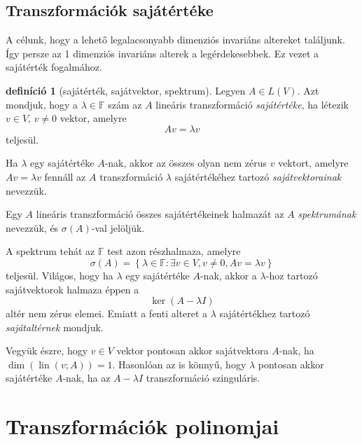 \documentclass[9pt, a4paper, showtrims]{memoir}
\theoremstyle{plain}
\theoremstyle{remark}
\theoremstyle{definition}
\newtheorem{definition}[proposition]{definíció}
\DeclareMathOperator{\lin}{lin}
\begin{document}
\section{Transzformációk sajátértéke}
A célunk, hogy a lehető legalacsonyabb dimenziós invariáns altereket találjunk.
Így persze az 1 dimenziós invariáns alterek a legérdekesebbek.
Ez vezet a sajátérték fogalmához.
\begin{definition}[sajátérték, sajátvektor, spektrum]
	Legyen $A\in L\left( V \right)$.
	Azt mondjuk, hogy a $\lambda\in\mathbb{F}$ szám az $A$ lineáris transzformáció
	\emph{sajátértéke},
	ha létezik $v\in V$, $v\neq 0$ vektor, amelyre
	\[
		Av=\lambda v
	\]
	teljesül.

	Ha $\lambda$ egy sajátértéke $A$-nak,
	akkor az összes olyan nem zérus $v$ vektort,
	amelyre $Av=\lambda v$ fennáll az $A$ transzformáció $\lambda$ sajátértékéhez tartozó
	\emph{sajátvektorainak} nevezzük.

	Egy $A$ lineáris transzformáció összes sajátértékeinek halmazát az
	$A$ \emph{spektrumának} nevezzük, és
	$\sigma\left( A \right)$-val jelöljük.
\end{definition}
A spektrum tehát az $\mathbb{F}$ test azon részhalmaza, amelyre
\[
	\sigma\left( A \right)
	=
	\left\{
	\lambda\in\mathbb{F}:\exists v\in V, v\neq 0, Av=\lambda v
	\right\}
\]
teljesül.
Világos, hogy ha $\lambda$ egy sajátértéke $A$-nak, akkor a $\lambda$-hoz tartozó
sajátvektorok halmaza éppen a
\[
	\ker\left( A-\lambda I \right)
\]
altér nem zérus elemei.
Emiatt a fenti alteret a $\lambda$ sajátértékhez tartozó \emph{sajátaltérnek}
mondjuk.

Vegyük észre,
hogy $v\in V$ vektor pontosan akkor sajátvektora $A$-nak, ha $\dim\left( \lin\left( v;A \right) \right)=1$.
Hasonlóan az is könnyű, hogy $\lambda$ pontosan akkor sajátértéke $A$-nak,
ha az $A-\lambda I$ transzformáció szinguláris.

\chapter{Transzformációk polinomjai}
\end{document}

